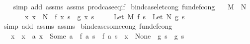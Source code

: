 \begin{isabellebody}
%
\isadelimproof
\ \ %
\endisadelimproof
%
\isatagproof
{}\isamarkupfalse%
\ {\isacharparenleft}{\kern0pt}simp\ add{\isacharcolon}{\kern0pt}\ assms{\isacharparenleft}{\kern0pt}{}{\isacharparenright}{\kern0pt}\ assms{\isacharparenleft}{\kern0pt}{}{\isacharparenright}{\kern0pt}\ prod{\isachardot}{\kern0pt}case{\isacharunderscore}{\kern0pt}eq{\isacharunderscore}{\kern0pt}if{\isacharparenright}{\kern0pt}%
\endisatagproof
{\isafoldproof}%
%
\isadelimproof
\isanewline
%
\endisadelimproof
\isanewline
{}\isamarkupfalse%
\ bind{\isacharunderscore}{\kern0pt}case{\isacharunderscore}{\kern0pt}let{\isacharunderscore}{\kern0pt}cong\ {\isacharbrackleft}{\kern0pt}fundef{\isacharunderscore}{\kern0pt}cong{\isacharbrackright}{\kern0pt}{\isacharcolon}{\kern0pt}\isanewline
\ \ \ {\isachardoublequoteopen}M\ {\isacharequal}{\kern0pt}\ N{\isachardoublequoteclose}\isanewline
\ \ \ \ \ \ \ {\isachardoublequoteopen}{\isacharparenleft}{\kern0pt}{\isasymAnd}x{\isachardot}{\kern0pt}\ x\ {\isacharequal}{\kern0pt}\ N\ {\isasymLongrightarrow}\ f\ x\ s\ {\isacharequal}{\kern0pt}\ g\ x\ s{\isacharparenright}{\kern0pt}{\isachardoublequoteclose}\isanewline
\ \ \ \ \ {\isachardoublequoteopen}{\isacharparenleft}{\kern0pt}Let\ M\ f{\isacharparenright}{\kern0pt}\ s\ {\isacharequal}{\kern0pt}\ {\isacharparenleft}{\kern0pt}Let\ N\ g{\isacharparenright}{\kern0pt}\ s{\isachardoublequoteclose}\isanewline
%
\isadelimproof
\ \ %
\endisadelimproof
%
\isatagproof
{}\isamarkupfalse%
\ {\isacharparenleft}{\kern0pt}simp\ add{\isacharcolon}{\kern0pt}\ assms{\isacharparenleft}{\kern0pt}{}{\isacharparenright}{\kern0pt}\ assms{\isacharparenleft}{\kern0pt}{}{\isacharparenright}{\kern0pt}{\isacharparenright}{\kern0pt}%
\endisatagproof
{\isafoldproof}%
%
\isadelimproof
\isanewline
%
\endisadelimproof
\isanewline
{}\isamarkupfalse%
\ bind{\isacharunderscore}{\kern0pt}case{\isacharunderscore}{\kern0pt}some{\isacharunderscore}{\kern0pt}cong\ {\isacharbrackleft}{\kern0pt}fundef{\isacharunderscore}{\kern0pt}cong{\isacharbrackright}{\kern0pt}{\isacharcolon}{\kern0pt}\isanewline
\ \ \ {\isachardoublequoteopen}x\ {\isacharequal}{\kern0pt}\ x{\isacharprime}{\kern0pt}{\isachardoublequoteclose}\ \ {\isachardoublequoteopen}{\isasymAnd}a{\isachardot}{\kern0pt}\ x\ {\isacharequal}{\kern0pt}\ Some\ a\ {\isasymLongrightarrow}\ f\ a\ s\ {\isacharequal}{\kern0pt}\ f{\isacharprime}{\kern0pt}\ a\ s{\isachardoublequoteclose}\ \ {\isachardoublequoteopen}x\ {\isacharequal}{\kern0pt}\ None\ {\isasymLongrightarrow}\ g\ s\ {\isacharequal}{\kern0pt}\ g{\isacharprime}{\kern0pt}\ s{\isachardoublequoteclose}\isanewline

\end{isabellebody}
